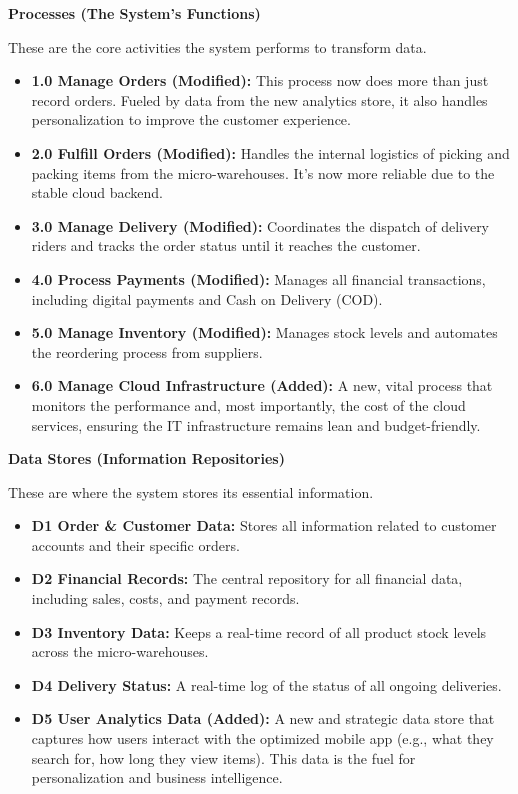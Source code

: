 \documentclass[12pt,a4paper]{article}
\begin{document}
\textbf{Processes (The System's Functions)}

These are the core activities the system performs to transform data.

\begin{itemize}
    \item \textbf{1.0 Manage Orders (Modified):} This process now does more than just record orders. Fueled by data from the new analytics store, it also handles personalization to improve the customer experience.
    \item \textbf{2.0 Fulfill Orders (Modified):} Handles the internal logistics of picking and packing items from the micro-warehouses. It's now more reliable due to the stable cloud backend.
    \item \textbf{3.0 Manage Delivery (Modified):} Coordinates the dispatch of delivery riders and tracks the order status until it reaches the customer.
    \item \textbf{4.0 Process Payments (Modified):} Manages all financial transactions, including digital payments and Cash on Delivery (COD).
    \item \textbf{5.0 Manage Inventory (Modified):} Manages stock levels and automates the reordering process from suppliers.
    \item \textbf{6.0 Manage Cloud Infrastructure (Added):} A new, vital process that monitors the performance and, most importantly, the cost of the cloud services, ensuring the IT infrastructure remains lean and budget-friendly.
\end{itemize}

\textbf{Data Stores (Information Repositories)}

These are where the system stores its essential information.

\begin{itemize}
    \item \textbf{D1 Order \& Customer Data:} Stores all information related to customer accounts and their specific orders.
    \item \textbf{D2 Financial Records:} The central repository for all financial data, including sales, costs, and payment records.
    \item \textbf{D3 Inventory Data:} Keeps a real-time record of all product stock levels across the micro-warehouses.
    \item \textbf{D4 Delivery Status:} A real-time log of the status of all ongoing deliveries.
    \item \textbf{D5 User Analytics Data (Added):} A new and strategic data store that captures how users interact with the optimized mobile app (e.g., what they search for, how long they view items). This data is the fuel for personalization and business intelligence.
\end{itemize}
\end{document}
